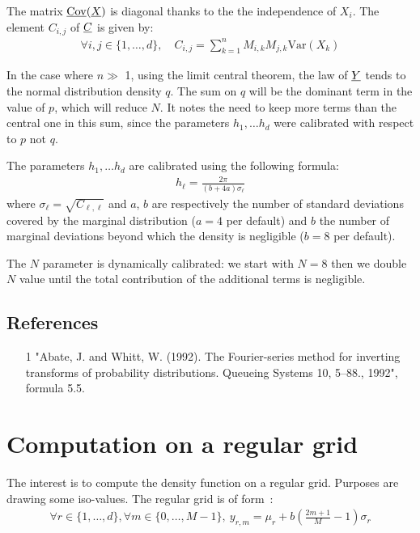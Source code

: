 The matrix ${\underline{\mathrm{Cov}}}({\underline{X}})$ is diagonal thanks to the the independence of $X_i$.
The element $C_{i,j}$ of ${\underline{C}}$ is given by:
\begin{align}
\forall i,j\in\{1,\hdots,d\},\quad C_{i,j}=\sum_{k=1}^nM_{i,k}M_{j,k}\mathrm{Var}(X_k)
\end{align}

In the case where $n \gg $ 1, using the limit central theorem, the law of ${\underline{Y}} $ tends to the normal distribution density $q$.
The sum on $q$ will be the dominant term in the value of $p$, which will reduce $N$.
It notes the need to keep more terms than the central one in this sum, since the parameters $ h_1, \dots  h_d$ were calibrated
with respect to $p$ not $q$.

The parameters $h_1, \dots  h_d$ are calibrated using the following formula:
\begin{align}
  h_\ell = \frac{2\pi}{(b+4a)\sigma_\ell}
\end{align}
where $\sigma_\ell=\sqrt{C_{\ell,\ell}}$ and $a$, $b$ are respectively the number of standard deviations covered by the marginal distribution
($a=4$ per default) and $b$ the number of marginal deviations beyond which the density is negligible ($b=8$ per default).

The $N$ parameter is dynamically calibrated: we start with $N=8$ then we double $N$ value until the total contribution of the additional terms is negligible.

\subsection{References}\label{ref}
\begin{itemize}
  \item[1] "Abate, J. and Whitt, W. (1992). The Fourier-series method for inverting transforms of probability distributions. Queueing Systems 10, 5--88., 1992",
        formula 5.5.
\end{itemize}

\section{Computation on a regular grid}
The interest is to compute the density function on a regular grid. Purposes are drawing some iso-values.
The regular grid is of form~:
\begin{align}
  \forall r\in\{1,\hdots,d\},\forall m\in\{0,\hdots,M-1\},\:y_{r,m}=\mu_r+b\left(\frac{2m+1}{M} - 1\right)\sigma_r
\end{align}

